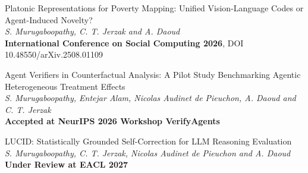 \documentclass[margin,line]{resume}
\begin{document}
\begin{resume}
\begin{list2}
            \item Platonic Representations for Poverty Mapping: Unified Vision-Language Codes or Agent-Induced Novelty?\\
            \textsl{S. Murugaboopathy, C. T. Jerzak and A. Daoud}\\
            \textbf{International Conference on Social Computing 2026}, DOI 10.48550/arXiv.2508.01109

            \item Agent Verifiers in Counterfactual Analysis: A Pilot Study Benchmarking Agentic Heterogeneous Treatment Effects\\
            \textsl{S. Murugaboopathy, Entejar Alam, Nicolas Audinet de Pieuchon, A. Daoud and C. T. Jerzak}\\
            \textbf{Accepted at NeurIPS 2026 Workshop VerifyAgents}

            \item LUCID: Statistically Grounded Self-Correction for LLM Reasoning Evaluation\\
            \textsl{S. Murugaboopathy, C. T. Jerzak, Nicolas Audinet de Pieuchon and A. Daoud}\\
            \textbf{Under Review at EACL 2027}
            
        \end{list2}

        
        

\end{resume}
\end{document}
